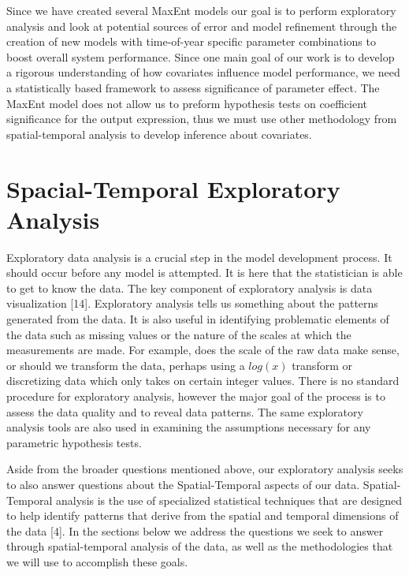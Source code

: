 \noindent Since we have created several MaxEnt models our goal is to perform exploratory analysis and look at potential sources of error and model refinement through the creation of new models with time-of-year specific parameter combinations to boost overall system performance. Since one main goal of our work is to develop a rigorous understanding of how covariates influence model performance, we need a statistically based framework to assess significance of parameter effect. The MaxEnt model does not allow us to preform hypothesis tests on coefficient significance for the output expression, thus we must use other methodology from spatial-temporal analysis to develop inference about covariates. 


\section{Spacial-Temporal Exploratory Analysis} 

Exploratory data analysis is a crucial step in the model development process. It should occur before any model is attempted. It is here that the statistician is able to get to know the data. The key component of exploratory analysis is data visualization [14]. Exploratory analysis tells us something about the patterns generated from the data. It is also useful in identifying problematic elements of the data such as missing values or the nature of the scales at which the measurements are made. For example, does the scale of the raw data make sense, or should we transform the data, perhaps using a $log(x)$ transform or discretizing data which only takes on certain integer values. There is no standard procedure for exploratory analysis, however the major goal of the process is to  assess the data quality and to reveal data patterns. The same exploratory analysis tools are also used in examining the assumptions necessary for any parametric hypothesis tests.\newline

\noindent Aside from the broader questions mentioned above, our exploratory analysis seeks to also answer questions about the Spatial-Temporal aspects of our data. Spatial-Temporal analysis is the use of specialized statistical techniques that are designed to help identify patterns that derive from the spatial and temporal dimensions of the data [4].  In the sections below we address the questions we seek to answer through spatial-temporal analysis of the data, as well as the methodologies that we will use to accomplish these goals. \newline

